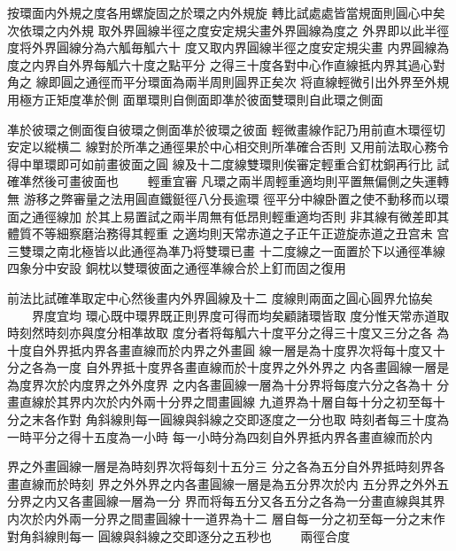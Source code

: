 \begin{正文}
按環面内外規之度各用螺旋固之於環之内外規旋
轉比試處處皆當規面則圓心中矣次依環之内外規
取外界圓線半徑之度安定規尖畫外界圓線為度之
外界即以此半徑度将外界圓線分為六觚毎觚六十
度又取内界圓線半徑之度安定規尖畫
内界圓線為度之内界自外界每觚六十度之點平分
之得三十度各對中心作直線抵内界其過心對角之
線即圓之通徑而平分環面為兩半周則圓界正矣次
将直線輕微引出外界至外規用極方正矩度凖於側
面單環則自側面即凖於彼面雙環則自此環之側面
\par
凖於彼環之側面復自彼環之側面凖於彼環之彼面
輕微畫線作記乃用前直木環徑切𦂳安定以縱横二
線對於所凖之通徑果於中心相交則所凖確合否則
又用前法取心務令得中單環即可如前畫彼面之圓
線及十二度線雙環則俟審定輕重合釘枕銅再行比
試確凖然後可畫彼面也
　　輕重宜審
凡環之兩半周輕重適均則平置無偏側之失運轉無
游移之弊審量之法用圓直鐵鋌徑八分長逾環
徑平分中線卧置之使不動移而以環面之通徑線加
於其上易置試之兩半周無有低昂則輕重適均否則
非其線有微差即其體質不等細察磨治務得其輕重
之適均則天常赤道之子正午正遊旋赤道之丑宫未
宫三雙環之南北極皆以此通徑為凖乃将雙環已畫
十二度線之一面置於下以通徑凖線四象分中安設
銅枕以雙環彼面之通徑凖線合於上釘而固之復用
\par
前法比試確凖取定中心然後畫内外界圓線及十二
度線則兩面之圓心圓界允協矣
　　界度宜均
環心既中環界既正則界度可得而均矣顧諸環皆取
度分惟天常赤道取時刻然時刻亦與度分相凖故取
度分者将每觚六十度平分之得三十度又三分之各
為十度自外界抵内界各畫直線而於内界之外畫圓
線一層是為十度界次将每十度又十分之各為一度
自外界抵十度界各畫直線而於十度界之外外界之
内各畫圓線一層是為度界次於内度界之外外度界
之内各畫圓線一層為十分界将每度六分之各為十
分畫直線於其界内次於内外兩十分界之間畫圓線
九道界為十層自每十分之初至每十分之末各作對
角斜線則每一圓線與斜線之交即逐度之一分也取
時刻者每三十度為一時平分之得十五度為一小時
每一小時分為四刻自外界抵内界各畫直線而於内
\par
界之外畫圓線一層是為時刻界次将每刻十五分三
分之各為五分自外界抵時刻界各畫直線而於時刻
界之外外界之内各畫圓線一層是為五分界次於内
五分界之外外五分界之内又各畫圓線一層為一分
界而将每五分又各五分之各為一分畫直線與其界
内次於内外兩一分界之間畫圓線十一道界為十二
層自每一分之初至每一分之末作對角斜線則每一
圓線與斜線之交即逐分之五秒也
　　兩徑合度

\end{正文}
